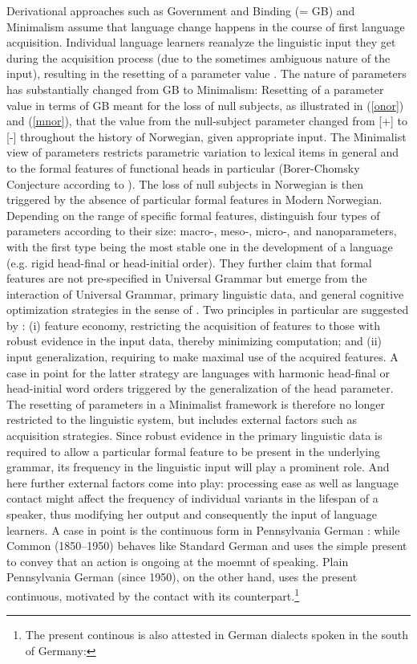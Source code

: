 \documentclass[output=paper
	        ,collection
	        ,collectionchapter
 	        ,biblatex
                ,babelshorthands
                ,newtxmath
                ,draftmode
                ,colorlinks, citecolor=brown
]{./langsci/langscibook}
\begin{document}
Derivational approaches such as Government and Binding (= GB) and Minimalism assume that language change happens in the course of first language acquisition. Individual language learners reanalyze the linguistic input they get during the acquisition process (due to the sometimes ambiguous nature of the input), resulting in the resetting of a parameter value \citep{lightfoot1979}. The nature of parameters has substantially changed from GB to Minimalism: Resetting of a parameter value in terms of GB meant for the loss of null subjects, as illustrated in (\ref{onor}) and (\ref{mnor}), that the value from the null-subject parameter changed from [+] to [-] throughout the history of Norwegian, given appropriate input. The Minimalist view of parameters restricts parametric variation to lexical items in general and to the formal features of functional heads in particular (Borer-Chomsky Conjecture according to \cite{baker2008}). The loss of null subjects in Norwegian is then triggered by the absence of particular formal features in Modern Norwegian. Depending on the range of specific formal features, \cite{BiRo2017} distinguish four types of parameters according to their size: macro-, meso-, micro-, and nanoparameters, with the first type being the most stable one in the development of a language (e.g. rigid head-final or head-initial order). They further claim that formal features are not pre-specified in Universal Grammar but emerge from the interaction of Universal Grammar, primary linguistic data, and general cognitive optimization strategies in the sense of \cite{chomsky2005}. Two principles in particular are suggested by \cite{BiRo2017}: (i) feature economy, restricting the acquisition of features to those with robust evidence in the input data, thereby minimizing computation; and (ii) input generalization, requiring to make maximal use of the acquired features. A case in point for the latter strategy are languages with harmonic head-final or head-initial word orders triggered by the generalization of the head parameter. The resetting of parameters in a Minimalist framework is therefore no longer restricted to the linguistic system, but includes external factors such as acquisition strategies. Since robust evidence in the primary linguistic data is required to allow a particular formal feature to be present in the underlying grammar, its frequency in the linguistic input will play a prominent role. And here further external factors come into play: processing ease as well as language contact might affect the frequency of individual variants in the lifespan of a speaker, thus modifying her output and consequently the input of language learners. A case in point is the continuous form in Pennsylvania German \citep{louden1988}: while Common  (1850--1950) behaves like Standard German and uses the simple present to convey that an action is ongoing at the moemnt of speaking. Plain Pennsylvania German (since 1950), on the other hand, uses the present continuous, motivated by the contact with its  counterpart.\footnote{The present continous is also attested in German dialects spoken in the south of Germany: 
}
\end{document}
